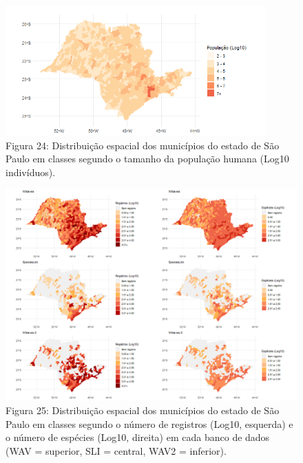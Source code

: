 \begin{itemize}
\begin{figure}[h!]
\centering
\includegraphics[width = 10cm]{Imagens/531.png}
\\{\scriptsize Figura 24: Distribuição espacial dos municípios do estado de São Paulo em classes segundo o tamanho da população humana (Log10 indivíduos).}
\end{figure}

\begin{figure}[h!]
\centering
\includegraphics[width = 15cm]{Imagens/561.png}
\\{\scriptsize Figura 25: Distribuição espacial dos municípios do estado de São Paulo em classes segundo o número de registros (Log10, esquerda) e o número de espécies (Log10, direita) em cada banco de dados (WAV = superior, SLI = central, WAV2 = inferior).}
\end{figure}

\end{itemize}

\newpage
